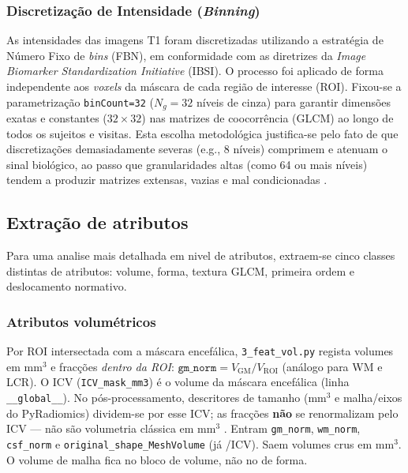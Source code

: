 \documentclass[review]{elsarticle}
\newcommand{\code}[1]{\texttt{#1}}
\begin{document}
\subsubsection{Discretização de Intensidade (\emph{Binning})}

As intensidades das imagens T1 foram discretizadas utilizando a estratégia de Número Fixo de \emph{bins} (FBN), em conformidade com as diretrizes da \emph{Image Biomarker Standardization Initiative} (IBSI). O processo foi aplicado de forma independente aos \emph{voxels} da máscara de cada região de interesse (ROI). Fixou-se a parametrização \code{binCount=32} ($N_g=32$ níveis de cinza) para garantir dimensões exatas e constantes ($32 \times 32$) nas matrizes de coocorrência (GLCM) ao longo de todos os sujeitos e visitas. Esta escolha metodológica justifica-se pelo fato de que discretizações demasiadamente severas (e.g., 8 níveis) comprimem e atenuam o sinal biológico, ao passo que granularidades altas (como 64 ou mais níveis) tendem a produzir matrizes extensas, vazias e mal condicionadas \cite{molina-2016}.
	
\subsection{Extração de atributos}\label{sec:feature-extraction}

Para uma analise mais detalhada em nivel de atributos, extraem-se cinco classes distintas de atributos: volume, forma, textura GLCM, primeira ordem e deslocamento normativo.

\subsubsection{Atributos volumétricos}\label{subsubsec:feat_vol}

Por ROI intersectada com a máscara encefálica, \code{3\_feat\_vol.py} regista volumes em mm$^3$ e fracções \emph{dentro da ROI}: $\mathtt{gm\_norm}=V_{\mathrm{GM}}/V_{\mathrm{ROI}}$ (análogo para WM e LCR).
O ICV (\code{ICV\_mask\_mm3}) é o volume da máscara encefálica (linha \code{\_\_global\_\_}).
No pós-processamento, descritores de tamanho (mm$^3$ e malha/eixos do PyRadiomics) dividem-se por esse ICV; as fracções \textbf{não} se renormalizam pelo ICV --- não são volumetria clássica em mm$^3$ \cite{wyman-2013}.
Entram \code{gm\_norm}, \code{wm\_norm}, \code{csf\_norm} e \code{original\_shape\_MeshVolume} (já /ICV).
Saem volumes crus em mm$^3$.
O volume de malha fica no bloco de volume, não no de forma.
\end{document}
